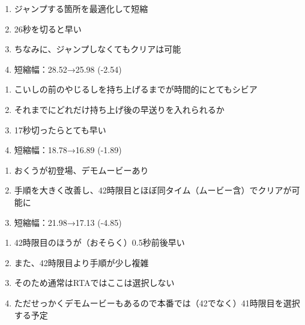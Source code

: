 \begin{enumerate}[label={\sarrow}]
\item ジャンプする箇所を最適化して短縮
\item 26秒を切ると早い
\item ちなみに、ジャンプしなくてもクリアは可能
\item 短縮幅：28.52→25.98 (-2.54)
\end{enumerate}



\begin{enumerate}[label={\sarrow}]
\item こいしの前のやじるしを持ち上げるまでが時間的にとてもシビア
\item それまでにどれだけ持ち上げ後の早送りを入れられるか
\item 17秒切ったらとても早い
\item 短縮幅：18.78→16.89 (-1.89)
\end{enumerate}








\begin{enumerate}[label={\sarrow}]
\item おくうが初登場、デモムービーあり
\item 手順を大きく改善し、42時限目とほぼ同タイム（ムービー含）でクリアが可能に
\item 短縮幅：21.98→17.13 (-4.85)
\end{enumerate}
\begin{marker}
\begin{enumerate}[label={\sarrow}]
\item 42時限目のほうが（おそらく）0.5秒前後早い
\item また、42時限目より手順が少し複雑
\item そのため通常はRTAではここは選択しない
\item ただせっかくデモムービーもあるので本番では（42でなく）41時限目を選択する予定
\end{enumerate}
\end{marker}


